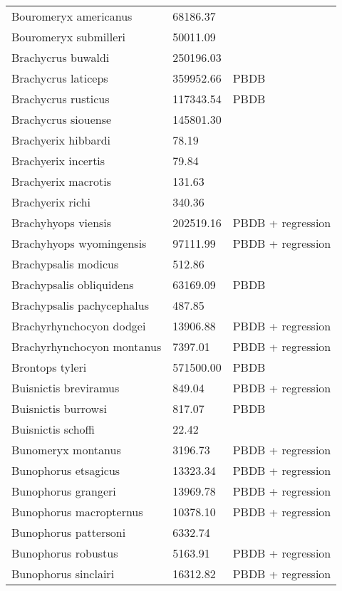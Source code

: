 \documentclass{article}
\begin{document}
\begin{center}
\begin{longtable}{p{} p{} p{} }
  Bouromeryx americanus & 68186.37 & \cite{Tomiya2013} \\ 
  Bouromeryx submilleri & 50011.09 & \cite{Tomiya2013} \\ 
  Brachycrus buwaldi & 250196.03 & \cite{Tomiya2013} \\ 
  Brachycrus laticeps & 359952.66 & PBDB \\ 
  Brachycrus rusticus & 117343.54 & PBDB \\ 
  Brachycrus siouense & 145801.30 & \cite{Tomiya2013} \\ 
  Brachyerix hibbardi & 78.19 & \cite{Clemens2011} \\ 
  Brachyerix incertis & 79.84 & \cite{Tomiya2013} \\ 
  Brachyerix macrotis & 131.63 & \cite{Tomiya2013} \\ 
  Brachyerix richi & 340.36 & \cite{Tomiya2013} \\ 
  Brachyhyops viensis & 202519.16 & PBDB + regression \\ 
  Brachyhyops wyomingensis & 97111.99 & PBDB + regression \\ 
  Brachypsalis modicus & 512.86 & \cite{Tomiya2013} \\ 
  Brachypsalis obliquidens & 63169.09 & PBDB \\ 
  Brachypsalis pachycephalus & 487.85 & \cite{Tomiya2013} \\ 
  Brachyrhynchocyon dodgei & 13906.88 & PBDB + regression \\ 
  Brachyrhynchocyon montanus & 7397.01 & PBDB + regression \\ 
  Brontops tyleri & 571500.00 & PBDB \\ 
  Buisnictis breviramus & 849.04 & PBDB + regression \\ 
  Buisnictis burrowsi & 817.07 & PBDB \\ 
  Buisnictis schoffi & 22.42 & \cite{Tomiya2013} \\ 
  Bunomeryx montanus & 3196.73 & PBDB + regression \\ 
  Bunophorus etsagicus & 13323.34 & PBDB + regression \\ 
  Bunophorus grangeri & 13969.78 & PBDB + regression \\ 
  Bunophorus macropternus & 10378.10 & PBDB + regression \\ 
  Bunophorus pattersoni & 6332.74 & \cite{Macdonald1956} \\ 
  Bunophorus robustus & 5163.91 & PBDB + regression \\ 
  Bunophorus sinclairi & 16312.82 & PBDB + regression \\ 

\end{longtable}
\end{center}
\end{document}

